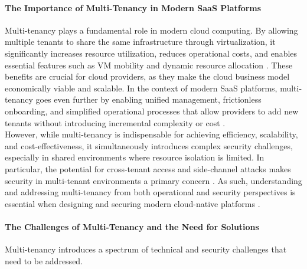 \documentclass[11pt, a4paper, oneside, draft]{scrartcl}
\begin{document}
            \paragraph{The Importance of Multi-Tenancy in Modern SaaS Platforms}
                Multi-tenancy plays a fundamental role in modern cloud computing. 
                By allowing multiple tenants to share the same infrastructure through
                virtualization, it significantly increases resource utilization, reduces operational
                costs, and enables essential features such as VM mobility and dynamic resource
                allocation \parencite[pp.~345--346]{aljahdali2014}. 
                These benefits are crucial for cloud providers, as they make the cloud business
                model economically viable and scalable. 
                In the context of modern SaaS platforms, multi-tenancy goes even further by enabling
                unified management, frictionless onboarding, and simplified operational processes
                that allow providers to add new tenants without introducing incremental complexity
                or cost \parencite[pp.~9--11]{awsSaaSArchitectureFundamentals}.
                \\
                However, while multi-tenancy is indispensable for achieving efficiency, scalability,
                and cost-effectiveness, it simultaneously introduces complex security challenges,
                especially in shared environments where resource isolation is limited. 
                In particular, the potential for cross-tenant access and side-channel attacks makes
                security in multi-tenant environments a primary concern
                \parencite[pp.~345--346]{aljahdali2014}. 
                As such, understanding and addressing multi-tenancy from both operational and
                security perspectives is essential when designing and securing modern cloud-native
                platforms
                \parencites[pp.~9--11]{awsSaaSArchitectureFundamentals}[p.~4]{isoConcepts}.

            \paragraph{The Challenges of Multi-Tenancy and the Need for Solutions}
                Multi-tenancy introduces a spectrum of technical and security challenges that need
                to be addressed.
\end{document}
